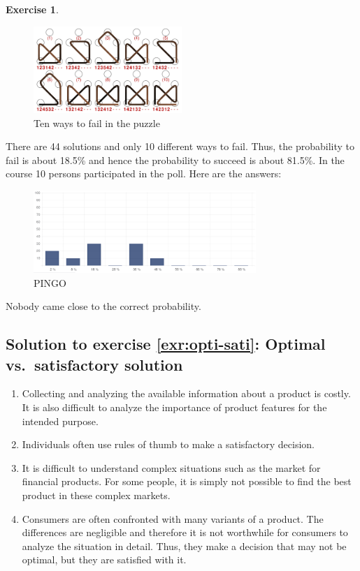 \documentclass[
  12pt,
  oneside]{book}
\providecommand{\tightlist}{%
  \setlength{\itemsep}{0pt}\setlength{\parskip}{0pt}}
\theoremstyle{definition}
\theoremstyle{definition}
\theoremstyle{definition}
\newtheorem{exercise}{Exercise}[chapter]
\theoremstyle{definition}
\theoremstyle{remark}
\begin{document}
\begin{exercise}
\begin{figure}
\centering
\includegraphics[width=0.5\textwidth,height=\textheight]{fig/nikolaus3.png}
\caption[\label{fig:nikolaus3} Ten ways to fail in the puzzle]{\label{fig:nikolaus3} Ten ways to fail in the puzzle\footnotemark{}}
\end{figure}

There are 44 solutions and only 10 different ways to fail. Thus, the probability to fail is about 18.5\% and hence the probability to succeed is about 81.5\%. In the course 10 persons participated in the poll. Here are the answers:

\begin{figure}
\centering
\includegraphics[width=0.75\textwidth,height=\textheight]{fig/nikolaus-poll.png}
\caption{\label{fig:nikolaus-poll} PINGO}
\end{figure}

Nobody came close to the correct probability.

\hypertarget{sol:opti-sati}{%
\subsection*{Solution to exercise \ref{exr:opti-sati}: Optimal vs.~satisfactory solution}\label{sol:opti-sati}}

\begin{enumerate}
\def\labelenumi{\Alph{enumi})}
\tightlist
\item
  Collecting and analyzing the available information about a product is costly. It is also difficult to analyze the importance of product features for the intended purpose.
\item
  Individuals often use rules of thumb to make a satisfactory decision.
\item
  It is difficult to understand complex situations such as the market for financial products. For some people, it is simply not possible to find the best product in these complex markets.
\item
  Consumers are often confronted with many variants of a product. The differences are negligible and therefore it is not worthwhile for consumers to analyze the situation in detail. Thus, they make a decision that may not be optimal, but they are satisfied with it.
\end{enumerate}


\end{exercise}
\end{document}
